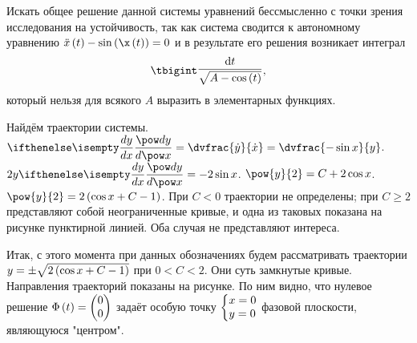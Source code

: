 \documentclass[a5paper,10pt]{article}
\begin{document}
Искать общее решение данной системы уравнений бессмысленно с точки зрения 
исследования на устойчивость, так как система сводится к автономному уравнению 
$\ddot{x}\br{t} - \sin\br{\x\br{t}} = 0$ и в результате его решения возникает интеграл
$$\tbigint \raisebox{0.15em}{$\dfrac {\di t} {\sqrt{A - \cos\br{t}}}$},$$
который нельзя для всякого $A$ выразить в элементарных функциях.

Найдём траектории системы. 
$\der{y}{x} = \dvfrac {\dot{y}} {\dot{x}} = \dvfrac {-\sin{x}} {y}$.
$2y \der{y}{x} = -2\sin{x}$. 
$\pow{y}{2} = C + 2\cos{x}$.
$\pow{y}{2} = 2\br{\cos x + C - 1}$. 
При $C < 0$ траектории не определены; при $C \ge 2$ представляют собой неограниченные 
кривые, и одна из таковых показана на рисунке пунктирной линией.
Оба случая не представляют интереса.

Итак, с этого момента при данных обозначениях будем рассматривать траектории 
$y = \pm \sqrt{2\left(\hspace{0.01em}\cos{x} + C - 1\hspace{0.01em}\right)}$ при $0 < C < 2$. 
Они суть замкнутые кривые. Направления траекторий показаны на рисунке.
По ним видно, что нулевое решение 
$\Phi\left(\hspace{0.01em}t\hspace{0.01em}\right) = \begin{pmatrix} 0 \\ 0 \end{pmatrix}$
задаёт особую точку 
$\tsys{x = 0 \\ y = 0}$
фазовой плоскости, являющуюся "центром".
\end{document}
